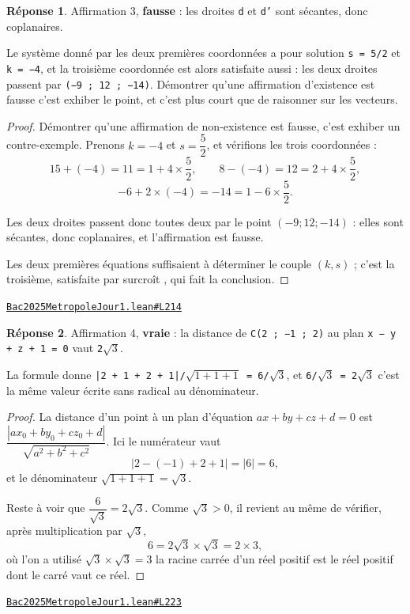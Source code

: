 \documentclass[11pt,a4paper]{article}
\theoremstyle{definition}
\theoremstyle{plain}
\theoremstyle{definition}
\newtheorem*{reponse}{Réponse}
\newcommand{\source}[2]{\par\smallskip\noindent\hfill{\footnotesize\href{#1}{\texttt{#2}}}\par\smallskip}
\begin{document}
\begin{reponse}
Affirmation 3, \textbf{fausse} : les droites \texttt{d} et \texttt{d'} sont sécantes, donc
coplanaires.

Le système donné par les deux premières coordonnées a pour solution \texttt{s = 5/2} et
\texttt{k = −4}, et la troisième coordonnée est alors satisfaite aussi : les deux droites
passent par \texttt{(−9 ; 12 ; −14)}. Démontrer qu'une affirmation d'existence est fausse
c'est exhiber le point, et c'est plus court que de raisonner sur les vecteurs.
\end{reponse}
\begin{proof}
Démontrer qu'une affirmation de non-existence est fausse, c'est exhiber un contre-exemple.
Prenons $k = -4$ et $s = \dfrac{5}{2}$, et vérifions les trois coordonnées :
\[ 15 + (-4) = 11 = 1 + 4 \times \frac{5}{2} , \qquad
   8 - (-4) = 12 = 2 + 4 \times \frac{5}{2} , \]
\[ -6 + 2 \times (-4) = -14 = 1 - 6 \times \frac{5}{2} . \]

Les deux droites passent donc toutes deux par le point $(-9 ; 12 ; -14)$ : elles sont
sécantes, donc coplanaires, et l'affirmation est fausse.

Les deux premières équations suffisaient à déterminer le couple $(k, s)$ ; c'est la
troisième, satisfaite \og{} par surcroît \fg{}, qui fait la conclusion.
\end{proof}
\source{https://github.com/Commutator-IO/learn-lean/blob/main/exams/2025/Bac2025MetropoleJour1.lean\#L214}{Bac2025MetropoleJour1.lean\#L214}

\begin{reponse}
Affirmation 4, \textbf{vraie} : la distance de \texttt{C(2 ; −1 ; 2)} au plan
\texttt{x − y + z + 1 = 0} vaut \texttt{2\(\sqrt{3}\)}.

La formule donne \texttt{|2 + 1 + 2 + 1|/\(\sqrt{1 + 1 + 1}\) = 6/\(\sqrt{3}\)}, et \texttt{6/\(\sqrt{3}\) = 2\(\sqrt{3}\)} \textemdash{} c'est la
même valeur écrite sans radical au dénominateur.
\end{reponse}
\begin{proof}
La distance d'un point à un plan d'équation $ax + by + cz + d = 0$ est
$\dfrac{|ax_0 + by_0 + cz_0 + d|}{\sqrt{a^2 + b^2 + c^2}}$. Ici le numérateur vaut
\[ |2 - (-1) + 2 + 1| = |6| = 6 , \]
et le dénominateur $\sqrt{1 + 1 + 1} = \sqrt{3}$.

Reste à voir que $\dfrac{6}{\sqrt{3}} = 2\sqrt{3}$. Comme $\sqrt{3} > 0$, il revient au
même de vérifier, après multiplication par $\sqrt{3}$,
\[ 6 = 2\sqrt{3} \times \sqrt{3} = 2 \times 3 , \]
où l'on a utilisé $\sqrt{3} \times \sqrt{3} = 3$ \textemdash{} la racine carrée d'un réel
positif est le réel positif dont le carré vaut ce réel.
\end{proof}
\source{https://github.com/Commutator-IO/learn-lean/blob/main/exams/2025/Bac2025MetropoleJour1.lean\#L223}{Bac2025MetropoleJour1.lean\#L223}
\end{document}
